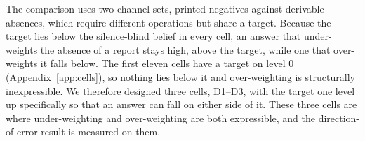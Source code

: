 \documentclass{article}
\theoremstyle{plain}
\theoremstyle{definition}
\theoremstyle{remark}
\newif\ifanchorlead
\begin{document}
The comparison uses two channel sets, printed negatives against derivable
absences, which require different operations but share a target. 
Because the target lies below the silence-blind
belief in every cell, an answer that under-weights the absence of a report stays high, above
the target, while one that over-weights it falls below. The first eleven cells have a
target on level 0 (Appendix~\ref{app:cells}), so nothing lies
below it and over-weighting is structurally inexpressible. We therefore designed three cells, 
D1--D3, with the target one level up specifically so that an answer can fall on either
side of it. These three cells are where under-weighting and over-weighting are both
expressible, and the direction-of-error result is measured on them.

\end{document}
